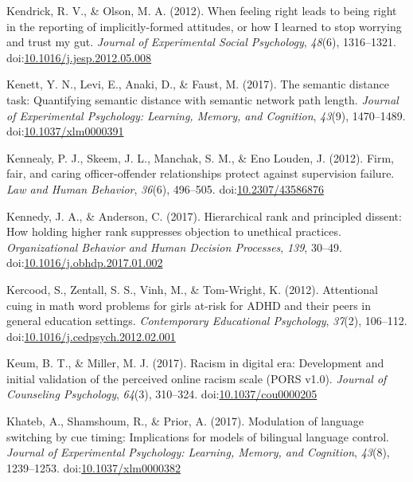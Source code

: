 \documentclass[english,man]{apa6}
\theoremstyle{definition}
\theoremstyle{definition}
\theoremstyle{definition}
\theoremstyle{remark}
\begin{document}
\hypertarget{ref-Kendrick2012}{}
Kendrick, R. V., \& Olson, M. A. (2012). When feeling right leads to
being right in the reporting of implicitly-formed attitudes, or how I
learned to stop worrying and trust my gut. \emph{Journal of Experimental
Social Psychology}, \emph{48}(6), 1316--1321.
doi:\href{https://doi.org/10.1016/j.jesp.2012.05.008}{10.1016/j.jesp.2012.05.008}

\hypertarget{ref-Kenett2017}{}
Kenett, Y. N., Levi, E., Anaki, D., \& Faust, M. (2017). The semantic
distance task: Quantifying semantic distance with semantic network path
length. \emph{Journal of Experimental Psychology: Learning, Memory, and
Cognition}, \emph{43}(9), 1470--1489.
doi:\href{https://doi.org/10.1037/xlm0000391}{10.1037/xlm0000391}

\hypertarget{ref-Kennealy2012}{}
Kennealy, P. J., Skeem, J. L., Manchak, S. M., \& Eno Louden, J. (2012).
Firm, fair, and caring officer-offender relationships protect against
supervision failure. \emph{Law and Human Behavior}, \emph{36}(6),
496--505. doi:\href{https://doi.org/10.2307/43586876}{10.2307/43586876}

\hypertarget{ref-Kennedy2017}{}
Kennedy, J. A., \& Anderson, C. (2017). Hierarchical rank and principled
dissent: How holding higher rank suppresses objection to unethical
practices. \emph{Organizational Behavior and Human Decision Processes},
\emph{139}, 30--49.
doi:\href{https://doi.org/10.1016/j.obhdp.2017.01.002}{10.1016/j.obhdp.2017.01.002}

\hypertarget{ref-Kercood2012}{}
Kercood, S., Zentall, S. S., Vinh, M., \& Tom-Wright, K. (2012).
Attentional cuing in math word problems for girls at-risk for ADHD and
their peers in general education settings. \emph{Contemporary
Educational Psychology}, \emph{37}(2), 106--112.
doi:\href{https://doi.org/10.1016/j.cedpsych.2012.02.001}{10.1016/j.cedpsych.2012.02.001}

\hypertarget{ref-Keum2017}{}
Keum, B. T., \& Miller, M. J. (2017). Racism in digital era: Development
and initial validation of the perceived online racism scale (PORS v1.0).
\emph{Journal of Counseling Psychology}, \emph{64}(3), 310--324.
doi:\href{https://doi.org/10.1037/cou0000205}{10.1037/cou0000205}

\hypertarget{ref-Khateb2017}{}
Khateb, A., Shamshoum, R., \& Prior, A. (2017). Modulation of language
switching by cue timing: Implications for models of bilingual language
control. \emph{Journal of Experimental Psychology: Learning, Memory, and
Cognition}, \emph{43}(8), 1239--1253.
doi:\href{https://doi.org/10.1037/xlm0000382}{10.1037/xlm0000382}
\end{document}
